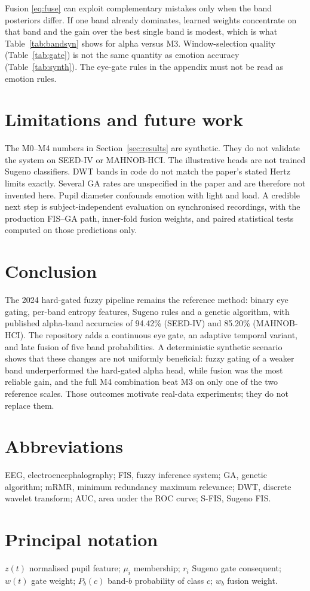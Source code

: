 Fusion \eqref{eq:fuse} can exploit complementary mistakes only when the band posteriors differ. If one band already dominates, learned weights concentrate on that band and the gain over the best single band is modest, which is what Table~\ref{tab:bandsyn} shows for alpha versus M3. Window-selection quality (Table~\ref{tab:gate}) is not the same quantity as emotion accuracy (Table~\ref{tab:synth}). The eye-gate rules in the appendix must not be read as emotion rules.

\section{Limitations and future work}
The M0--M4 numbers in Section~\ref{sec:results} are synthetic. They do not validate the system on SEED-IV or MAHNOB-HCI. The illustrative heads are not trained Sugeno classifiers. DWT bands in code do not match the paper's stated Hertz limits exactly. Several GA rates are unspecified in the paper and are therefore not invented here. Pupil diameter confounds emotion with light and load. A credible next step is subject-independent evaluation on synchronised recordings, with the production FIS--GA path, inner-fold fusion weights, and paired statistical tests \cite{Demsar2006} computed on those predictions only.

\section{Conclusion}
The 2024 hard-gated fuzzy pipeline \cite{FarhadiSedehi2024a} remains the reference method: binary eye gating, per-band entropy features, Sugeno rules and a genetic algorithm, with published alpha-band accuracies of 94.42\% (SEED-IV) and 85.20\% (MAHNOB-HCI). The repository adds a continuous eye gate, an adaptive temporal variant, and late fusion of five band probabilities. A deterministic synthetic scenario shows that these changes are not uniformly beneficial: fuzzy gating of a weaker band underperformed the hard-gated alpha head, while fusion was the most reliable gain, and the full M4 combination beat M3 on only one of the two reference scales. Those outcomes motivate real-data experiments; they do not replace them.

\section*{Abbreviations}
EEG, electroencephalography; FIS, fuzzy inference system; GA, genetic algorithm; mRMR, minimum redundancy maximum relevance; DWT, discrete wavelet transform; AUC, area under the ROC curve; S-FIS, Sugeno FIS.

\section*{Principal notation}
$z(t)$ normalised pupil feature; $\mu_i$ membership; $r_i$ Sugeno gate consequent; $w(t)$ gate weight; $P_b(c)$ band-$b$ probability of class $c$; $w_b$ fusion weight.
